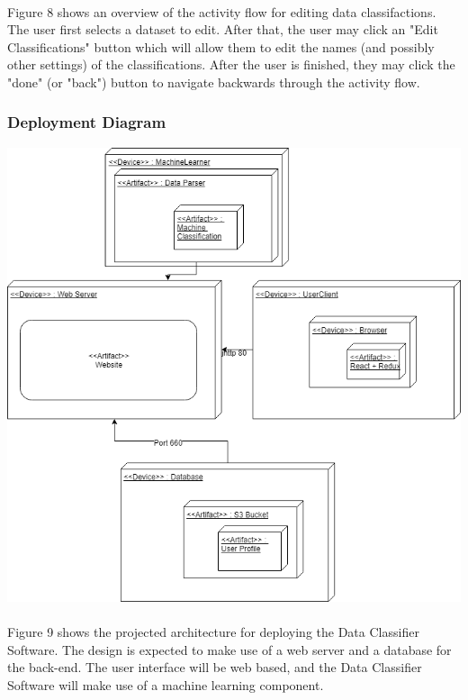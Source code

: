\documentclass[12pt,oneside,letterpaper]{article}
\begin{document}
\paragraph{}Figure 8 shows an overview of the activity flow for editing data classifactions. The user first selects a dataset to edit. After that, the user may click an "Edit Classifications" button which will allow them to edit the names (and possibly other settings) of the classifications. After the user is finished, they may click the "done" (or "back") button to navigate backwards through the activity flow.

 \subsubsection{Deployment Diagram}
\includegraphics[scale = 0.60]{bread_deployment_diagram.png}
\begingroup
{}
\endgroup

\paragraph{}Figure 9 shows the projected architecture for deploying the Data Classifier Software. The design is expected to make use of a web server and a database for the back-end. The user interface will be web based, and the Data Classifier Software will make use of a machine learning component.
\end{document}
